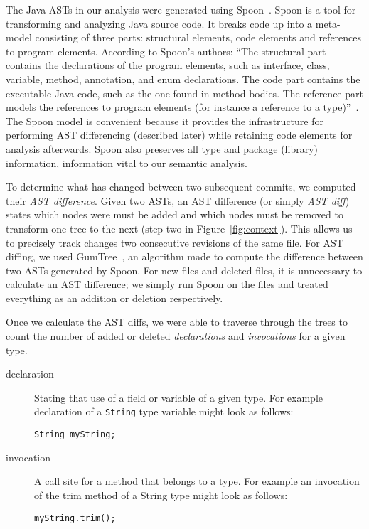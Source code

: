 The Java ASTs in our analysis were generated using Spoon~\cite{pawlak:hal-01169705}. Spoon is a tool for transforming and analyzing Java source code. It breaks code up into a meta-model consisting of three parts: structural elements, code elements and references to program elements. According to Spoon's authors: ``The structural part contains the declarations of the program elements, such as interface, class, variable, method, annotation, and enum declarations.  The code part contains the executable Java code, such as the one found in method bodies. The reference part models the references to program elements (for instance a reference to a type)''~\cite{pawlak:hal-01169705}. The Spoon model is convenient because it provides the infrastructure for performing AST differencing (described later) while retaining code elements for analysis afterwards. Spoon also preserves all type and package (library) information, information vital to our semantic analysis.

To determine what has changed between two subsequent commits, we computed their \emph{AST difference}. Given two ASTs, an AST difference (or simply \emph{AST diff}) states which nodes were must be added and which nodes must be removed to transform one tree to the next (step two in Figure~\ref{fig:context}). This allows us to precisely track changes two consecutive revisions of the same file. For AST diffing, we used GumTree~\cite{falleri:hal-01054552}, an algorithm made to compute the difference between two ASTs generated by Spoon. For new files and deleted files, it is unnecessary to calculate an AST difference; we simply run Spoon on the files and treated everything as an addition or deletion respectively.

Once we calculate the AST diffs, we were able to traverse through the trees to count the number of added or deleted \emph{declarations} and \emph{invocations} for a given type.

\begin{description}
\item [declaration] 
  Stating that use of a field or variable of a given type. For example declaration of a \texttt{String} type variable might look as follows:
  \\
  \begin{adjustwidth}{2.5em}{0pt}
  \texttt{String myString;} \\
  \end{adjustwidth}
\item [invocation] 
  A call site for a method that belongs to a type. For example an invocation of the trim method of a String type might look as follows:
  \\
  \begin{adjustwidth}{2.5em}{0pt}
  \texttt{myString.trim();} \\
  \end{adjustwidth}
\end{description}

